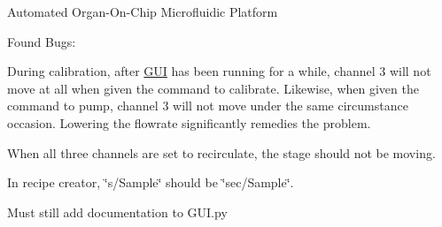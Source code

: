 Automated Organ-\/\+On-\/\+Chip Microfluidic Platform

Found Bugs\+:
\begin{DoxyItemize}
\item During calibration, after \mbox{\hyperlink{namespace_g_u_i}{G\+UI}} has been running for a while, channel 3 will not move at all when given the command to calibrate. Likewise, when given the command to pump, channel 3 will not move under the same circumstance occasion. Lowering the flowrate significantly remedies the problem.
\end{DoxyItemize}

When all three channels are set to recirculate, the stage should not be moving.

In recipe creator, \char`\"{}s/\+Sample\char`\"{} should be \char`\"{}sec/\+Sample\char`\"{}.


\begin{DoxyItemize}
\item Must still add documentation to G\+U\+I.\+py 
\end{DoxyItemize}